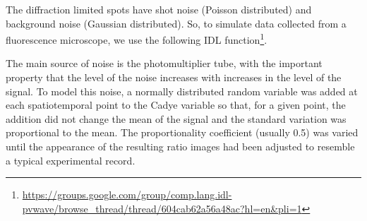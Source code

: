 The diffraction limited spots have shot noise (Poisson distributed) and
background noise (Gaussian distributed). So, to simulate data collected from a
fluorescence microscope, we use the following IDL
function\footnote{\url{https://groups.google.com/group/comp.lang.idl-pvwave/browse_thread/thread/604cab62a56a48ac?hl=en&pli=1}}.

The main source of noise is the photomultiplier tube, with the important
property that the level of the noise increases with increases in the level of
the signal. To model this noise, a normally distributed random variable was
added at each spatiotemporal point to the Cadye variable so that, for a given
point, the addition did not change the mean of the signal and the standard
variation was proportional to the mean. The proportionality coefficient (usually
0.5) was varied until the appearance of the resulting ratio images had been
adjusted to resemble a typical experimental record.

